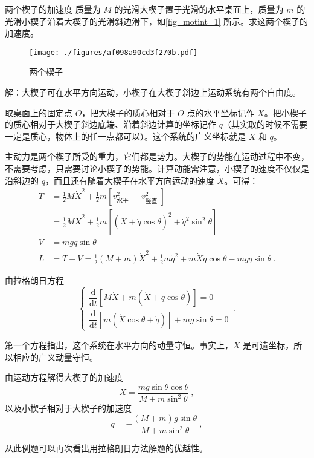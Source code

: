 \begin{example}{两个楔子的加速度}
质量为 $M$ 的光滑大楔子置于光滑的水平桌面上，质量为 $m$ 的光滑小楔子沿着大楔子的光滑斜边滑下，如\autoref{fig_motint_1} 所示。求这两个楔子的加速度。
\begin{figure}[ht]
\centering
\texttt{[image: ./figures/af098a90cd3f270b.pdf]}
\caption{两个楔子} \label{fig_motint_1}
\end{figure}

解：大楔子可在水平方向运动，小楔子在大楔子斜边上运动系统有两个自由度。

取桌面上的固定点 $O$，把大楔子的质心相对于 $O$ 点的水平坐标记作 $X $。把小楔子的质心相对于大楔子斜边底端、沿着斜边计算的坐标记作 $q$（其实取的时候不需要一定是质心，物体上的任一点都可以）。这个系统的广义坐标就是 $X $ 和 $q $。

主动力是两个楔子所受的重力，它们都是势力。大楔子的势能在运动过程中不变，不需要考虑，只需要讨论小楔子的势能。计算动能需注意，小楔子的速度不仅仅是沿斜边的 $\dot q$，而且还有随着大楔子在水平方向运动的速度 $\dot X$。可得：
\begin{equation}
\begin{aligned} T &=\frac{1}{2} M \dot{X}^{2}+\frac{1}{2} m\left[v_{\text {水平 }}^{2}+v_{\text {竖直 }}^{2}\right] \\ &=\frac{1}{2} M \dot{X}^{2}+\frac{1}{2} m\left[(\dot{X}+\dot{q} \cos \theta)^{2}+\dot{q}^{2} \sin ^{2} \theta\right] \\ V &=m g q \sin \theta \\ L &=T-V=\frac{1}{2}(M+m) \dot{X}^{2}+\frac{1}{2} m \dot{q}^{2}+m \dot{X} \dot{q} \cos \theta-m g q \sin \theta~. \end{aligned}
\end{equation}

由拉格朗日方程
\begin{equation}
\begin{cases}
\dfrac{\mathrm{d}}{\mathrm{d} t}[M \dot{X}+m(\dot{X}+\dot{q} \cos \theta)]=0 \\ \dfrac{\mathrm{d}}{\mathrm{d} t}[m(\dot{X} \cos \theta+\dot{q})]+m g \sin \theta=0
\end{cases}~.
\end{equation}

第一个方程指出，这个系统在水平方向的动量守恒。事实上，$X$ 是可遗坐标，所以相应的广义动量守恒。

由运动方程解得大楔子的加速度
\begin{equation}
\ddot{X}=\frac{m g \sin \theta \cos \theta}{M+m \sin ^{2} \theta}~,
\end{equation}
以及小楔子相对于大楔子的加速度
\begin{equation}
\ddot{q}=-\frac{(M+m) g \sin \theta}{M+m \sin ^{2} \theta}~,
\end{equation}
\end{example}
从此例题可以再次看出用拉格朗日方法解题的优越性。

